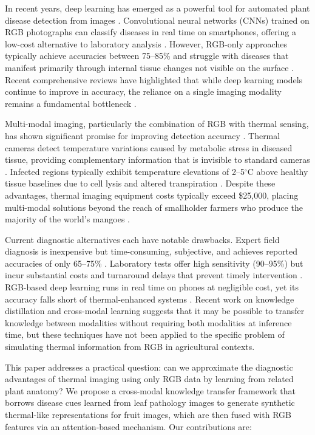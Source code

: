 \documentclass[utf8]{FrontiersinHarvard} %
\begin{document}
In recent years, deep learning has emerged as a powerful tool for automated plant disease detection from images \cite{mohanty2016,ferentinos2018,thakur2022}. Convolutional neural networks (CNNs) trained on RGB photographs can classify diseases in real time on smartphones, offering a low-cost alternative to laboratory analysis \cite{kamilaris2018,coulibaly2022}. However, RGB-only approaches typically achieve accuracies between 75--85\% and struggle with diseases that manifest primarily through internal tissue changes not visible on the surface \cite{pineda2021,abade2021}. Recent comprehensive reviews have highlighted that while deep learning models continue to improve in accuracy, the reliance on a single imaging modality remains a fundamental bottleneck \cite{thakur2022,hasan2024}.

Multi-modal imaging, particularly the combination of RGB with thermal sensing, has shown significant promise for improving detection accuracy \cite{khanal2017,maimaitijiang2020}. Thermal cameras detect temperature variations caused by metabolic stress in diseased tissue, providing complementary information that is invisible to standard cameras \cite{mahlein2016,pineda2021}. Infected regions typically exhibit temperature elevations of 2--5$^{\circ}$C above healthy tissue baselines due to cell lysis and altered transpiration \cite{mahlein2016}. Despite these advantages, thermal imaging equipment costs typically exceed \$25,000, placing multi-modal solutions beyond the reach of smallholder farmers who produce the majority of the world's mangoes \cite{sishodia2020}.

Current diagnostic alternatives each have notable drawbacks. Expert field diagnosis is inexpensive but time-consuming, subjective, and achieves reported accuracies of only 65--75\% \cite{ferentinos2018}. Laboratory tests offer high sensitivity (90--95\%) but incur substantial costs and turnaround delays that prevent timely intervention \cite{martinelli2015}. RGB-based deep learning runs in real time on phones at negligible cost, yet its accuracy falls short of thermal-enhanced systems \cite{mohanty2016,hasan2024}. Recent work on knowledge distillation \cite{hinton2015,li2023_kd} and cross-modal learning \cite{xu2023} suggests that it may be possible to transfer knowledge between modalities without requiring both modalities at inference time, but these techniques have not been applied to the specific problem of simulating thermal information from RGB in agricultural contexts.

This paper addresses a practical question: can we approximate the diagnostic advantages of thermal imaging using only RGB data by learning from related plant anatomy? We propose a cross-modal knowledge transfer framework that borrows disease cues learned from leaf pathology images to generate synthetic thermal-like representations for fruit images, which are then fused with RGB features via an attention-based mechanism. Our contributions are:
\end{document}
